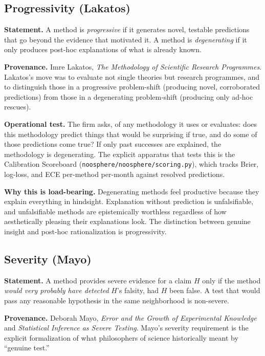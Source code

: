 \documentclass[11pt,letterpaper]{article}
\newcommand{\file}[1]{\texttt{#1}}
\begin{document}
\subsection{Progressivity (Lakatos)}

\textbf{Statement.} A method is \emph{progressive} if it generates novel, testable predictions that go beyond the evidence that motivated it. A method is \emph{degenerating} if it only produces post-hoc explanations of what is already known.

\textbf{Provenance.} Imre Lakatos, \textit{The Methodology of Scientific Research Programmes}. Lakatos's move was to evaluate not single theories but research programmes, and to distinguish those in a progressive problem-shift (producing novel, corroborated predictions) from those in a degenerating problem-shift (producing only ad-hoc rescues).

\textbf{Operational test.} The firm asks, of any methodology it uses or evaluates: does this methodology predict things that would be surprising if true, and do some of those predictions come true? If only past successes are explained, the methodology is degenerating. The explicit apparatus that tests this is the Calibration Scoreboard (\file{noosphere/noosphere/scoring.py}), which tracks Brier, log-loss, and ECE per-method per-month against resolved predictions.

\textbf{Why this is load-bearing.} Degenerating methods feel productive because they explain everything in hindsight. Explanation without prediction is unfalsifiable, and unfalsifiable methods are epistemically worthless regardless of how aesthetically pleasing their explanations look. The distinction between genuine insight and post-hoc rationalization is progressivity.

\subsection{Severity (Mayo)}

\textbf{Statement.} A method provides severe evidence for a claim $H$ only if the method \emph{would very probably have detected} $H$'s falsity, had $H$ been false. A test that would pass any reasonable hypothesis in the same neighborhood is non-severe.

\textbf{Provenance.} Deborah Mayo, \textit{Error and the Growth of Experimental Knowledge} and \textit{Statistical Inference as Severe Testing}. Mayo's severity requirement is the explicit formalization of what philosophers of science historically meant by ``genuine test.''
\end{document}
